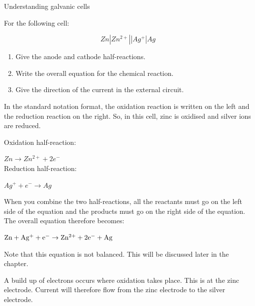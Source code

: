 \begin{wex}{Understanding galvanic cells\\}{
For the following cell:
\begin{center}
\begin{equation*}
Zn|Zn^{2+}||Ag^{+}|Ag
\end{equation*}
\end{center}
\begin{enumerate}
\item{Give the anode and cathode half-reactions.}
\item{Write the overall equation for the chemical reaction.}
\item{Give the direction of the current in the external circuit.}
\end{enumerate}
}

{

In the standard notation format, the oxidation reaction is written on the left and the reduction reaction on the right. So, in this cell, zinc is oxidised and silver ions are reduced.\\

Oxidation half-reaction:

\rm${Zn \rightarrow Zn^{2+} + 2e^{-}}$\\

Reduction half-reaction:

\rm${Ag^{+} + e^{-} \rightarrow Ag}$\\

When you combine the two half-reactions, all the reactants must go on the left side of the equation and the products must go on the right side of the equation. The overall equation therefore becomes:

\begin{center}
$\rm{Zn + Ag^{+} + e^{-} \rightarrow Zn^{2+} + 2e^{-} + Ag}$
\end{center}

Note that this equation is not balanced. This will be discussed later in the chapter.\\

A build up of electrons occurs where oxidation takes place. This is at the zinc electrode. Current will therefore flow from the zinc electrode to the silver electrode.
}
\end{wex}

